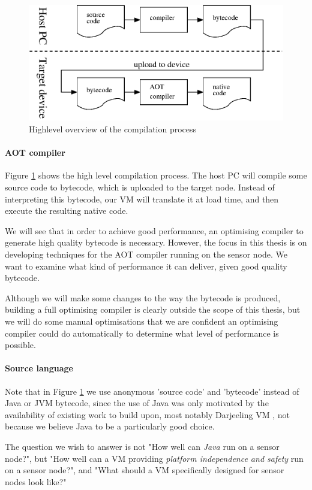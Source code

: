 \begin{figure}[]
  \centering
  \includegraphics[width=0.6\linewidth]{compilation-process-highlevel.eps}
  \caption{Highlevel overview of the compilation process}
  \label{fig-compilation-process-highlevel}
\end{figure}

\paragraph{AOT compiler}
Figure \ref{fig-compilation-process-highlevel} shows the high level compilation process. The host PC will compile some source code to bytecode, which is uploaded to the target node. Instead of interpreting this bytecode, our VM will translate it at load time, and then execute the resulting native code.

We will see that in order to achieve good performance, an optimising compiler to generate high quality bytecode is necessary. However, the focus in this thesis is on developing techniques for the AOT compiler running on the sensor node. We want to examine what kind of performance it can deliver, given good quality bytecode.

Although we will make some changes to the way the bytecode is produced, building a full optimising compiler is clearly outside the scope of this thesis, but we will do some manual optimisations that we are confident an optimising compiler could do automatically to determine what level of performance is possible.

\paragraph{Source language}
Note that in Figure \ref{fig-compilation-process-highlevel} we use anonymous 'source code' and 'bytecode' instead of Java or JVM bytecode, since the use of Java was only motivated by the availability of existing work to build upon, most notably Darjeeling VM \cite{Brouwers:2009cj}, not because we believe Java to be a particularly good choice.

The question we wish to answer is not "How well can \emph{Java} run on a sensor node?", but "How well can a VM providing \emph{platform independence and safety} run on a sensor node?", and "What should a VM specifically designed for sensor nodes look like?"

